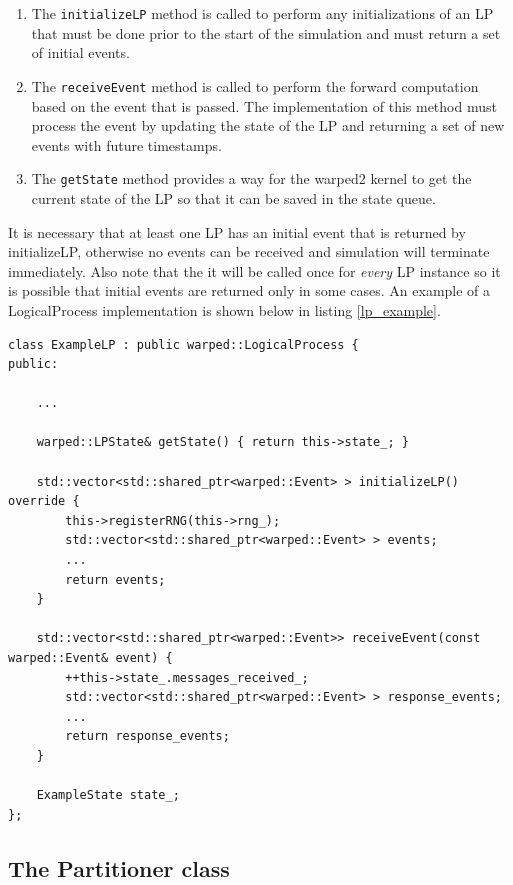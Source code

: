 \documentclass[11pt]{book}
\begin{document}
\begin{enumerate}
    \item The \texttt{initializeLP} method is called to perform any initializations of an LP that
        must be done prior to the start of the simulation and must return a set of initial events.
    \item The \texttt{receiveEvent} method is called to perform the forward computation based on
        the event that is passed. The implementation of this method must process the event by
        updating the state of the LP and returning a set of new events with future timestamps.
    \item The \texttt{getState} method provides a way for the warped2 kernel to get the current
        state of the LP so that it can be saved in the state queue.
\end{enumerate}

It is necessary that at least one LP has an initial event that is returned by initializeLP,
otherwise no events can be received and simulation will terminate immediately. Also note that
the it will be called once for \emph{every} LP instance so it is possible that initial events
are returned only in some cases. An example of a LogicalProcess implementation is shown below
in listing \ref{lp_example}.

\begin{lstlisting}[caption=Example \textsc{warped2} LogicalProcess Definition, label=lp_example, float]
class ExampleLP : public warped::LogicalProcess {
public:

    ...

    warped::LPState& getState() { return this->state_; }

    std::vector<std::shared_ptr<warped::Event> > initializeLP() override {
        this->registerRNG(this->rng_);
        std::vector<std::shared_ptr<warped::Event> > events;
        ...
        return events;
    }

    std::vector<std::shared_ptr<warped::Event>> receiveEvent(const warped::Event& event) {
        ++this->state_.messages_received_;
        std::vector<std::shared_ptr<warped::Event> > response_events;
        ...
        return response_events;
    }

    ExampleState state_;
};
\end{lstlisting}

\subsection{The Partitioner class}\label{partitioner}
\end{document}
